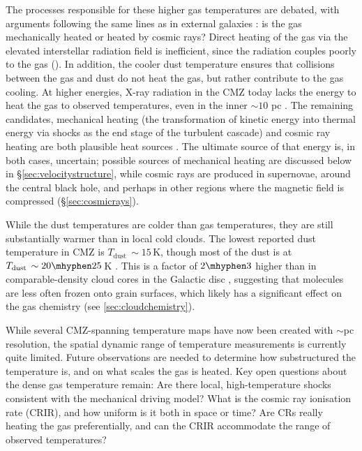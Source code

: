 The processes responsible for these higher gas temperatures are debated, with arguments following the same lines as in external galaxies \citep[e.g.,][]{Meijerink2011}: is the gas mechanically heated or heated by cosmic rays?  
Direct heating of the gas via the elevated interstellar radiation field is inefficient, since the radiation couples poorly to the gas (\citealp{Clark2013, Ginsburg2016, Oka2019}).
In addition, the cooler dust temperature ensures that collisions between the gas and dust do not heat the gas, but rather contribute to the gas cooling.
At higher energies, X-ray radiation in the CMZ today lacks the energy to heat the gas to observed temperatures, even in the inner $\sim10$ pc \citep{Ao2013}.
The remaining candidates, mechanical heating (the transformation of kinetic energy into thermal energy via shocks as the end stage of the turbulent cascade) and cosmic ray heating are both plausible heat sources \citep{Immer2016,Ginsburg2016,Krieger2017}.
The ultimate source of that energy is, in both cases, uncertain; possible sources of mechanical heating are discussed below in \S\ref{sec:velocitystructure},
while cosmic rays are produced in supernovae, around the central black hole, and perhaps in other regions where the magnetic field is compressed (\S\ref{sec:cosmicrays}). 

While the dust temperatures are colder than gas temperatures, they are still substantially warmer than in local cold clouds. The lowest reported dust temperature in CMZ is $T_\mathrm{dust}\,\sim15$\,K, though most of the dust is at $T_\mathrm{dust}\,\sim20\mhyphen25$\,K \citep{Tang2021b,Marsh2016}.
This is a factor of $2\mhyphen3$ higher than in comparable-density cloud cores in the Galactic disc \citep[e.g.][]{Peretto2010}, suggesting that molecules are less often frozen onto grain surfaces, which likely has a significant effect on the gas chemistry (see \ref{sec:cloudchemistry}).

While several CMZ-spanning temperature maps have now been created with $\sim$pc resolution, the spatial dynamic range of temperature measurements is currently quite limited.
Future observations are needed to determine how substructured the temperature is, and on what scales the gas is heated.
Key open questions about the dense gas temperature remain:
Are there local, high-temperature shocks consistent with the mechanical driving model?
What is the cosmic ray ionisation rate (CRIR), and how uniform is it both in space or time?
Are CRs really heating the gas preferentially, and can the CRIR accommodate the range of observed temperatures?


